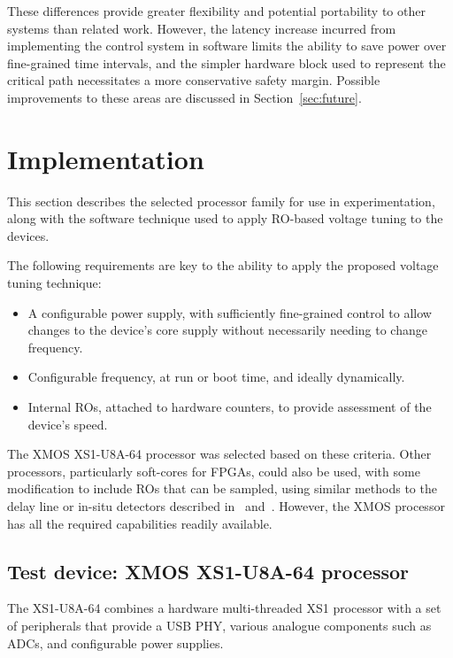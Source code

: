 \documentclass[a4paper,twocolumn,DIV=16]{scrartcl}
\begin{document}
These differences provide greater flexibility and potential portability to other
systems than related work. However, the latency increase incurred from
implementing the control system in software limits the ability to save power
over fine-grained time intervals, and the simpler hardware block used to
represent the critical path necessitates a more conservative safety margin.
Possible improvements to these areas are discussed in Section~\ref{sec:future}.

\section{Implementation}
\label{sec:imp}

This section describes the selected processor family for use in experimentation,
along with the software technique used to apply RO-based voltage tuning to the
devices.

The following requirements are key to the ability to apply the proposed voltage
tuning technique:

\begin{itemize}
\item A configurable power supply, with sufficiently fine-grained control to
allow changes to the device's core supply without necessarily needing to change
frequency.
\item Configurable frequency, at run or boot time, and ideally dynamically.
\item Internal ROs, attached to hardware counters, to provide assessment of the
device's speed.
\end{itemize}

The XMOS XS1-U8A-64 processor was selected based on these criteria. Other
processors, particularly soft-cores for FPGAs, could also be used, with some
modification to include ROs that can be sampled, using similar methods to the
delay line or in-situ detectors described in~\cite{Nabina2012}
and~\cite{Nunez-Yanez2013}.  However, the XMOS processor has all the required
capabilities readily available.


\subsection{Test device: XMOS XS1-U8A-64 processor}

The XS1-U8A-64 combines a hardware multi-threaded XS1 processor with a set of
peripherals that provide a USB PHY, various analogue components such as ADCs,
and configurable power supplies. 
\end{document}
